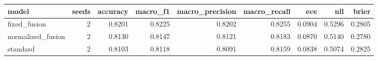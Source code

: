 \begin{tabular}{lrrrrrrrr}
\toprule
model & seeds & accuracy & macro_f1 & macro_precision & macro_recall & ece & nll & brier \\
\midrule
fixed_fusion & 2 & 0.8201 & 0.8225 & 0.8202 & 0.8255 & 0.0904 & 0.5296 & 0.2805 \\
normalized_fusion & 2 & 0.8130 & 0.8147 & 0.8121 & 0.8183 & 0.0870 & 0.5140 & 0.2780 \\
standard & 2 & 0.8103 & 0.8118 & 0.8091 & 0.8159 & 0.0838 & 0.5074 & 0.2825 \\
\bottomrule
\end{tabular}
